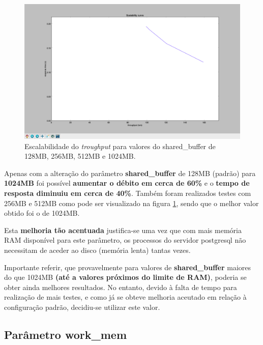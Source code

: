\begin{figure}[H]
    \centering
    \includegraphics[scale=0.3]{imagens/shared_buffer_scability.png}
    \caption{Escalabilidade do \emph{troughput} para valores do shared\_buffer de 128MB, 256MB, 512MB e 1024MB.}
    \label{fig:sharedbuffer}
\end{figure}

\hspace{5mm} Apenas com a alteração do parâmetro \textbf{shared\_buffer} de 128MB (padrão) para \textbf{1024MB} foi possível \textbf{aumentar o débito em cerca de 60\%} e o \textbf{tempo de resposta diminuiu em cerca de 40\%}. Também foram realizados testes com 256MB e 512MB como pode ser visualizado na figura \ref{fig:sharedbuffer}, sendo que o melhor valor obtido foi o de 1024MB. \newline

\hspace{5mm} Esta \textbf{melhoria tão acentuada} justifica-se uma vez que com mais memória RAM disponível para este parâmetro, os processos do servidor postgresql não necessitam de aceder ao disco (memória lenta) tantas vezes.

\hspace{5mm} Importante referir, que provavelmente para valores de \textbf{shared\_buffer} maiores do que 1024MB \textbf{(até a valores próximos do limite de RAM)}, poderia se obter ainda melhores resultados. No entanto, devido à falta de tempo para realização de mais testes, e como já se obteve melhoria aceutado em relação à configuração padrão, decidiu-se utilizar este valor.

\subsection{Parâmetro work\_mem}

